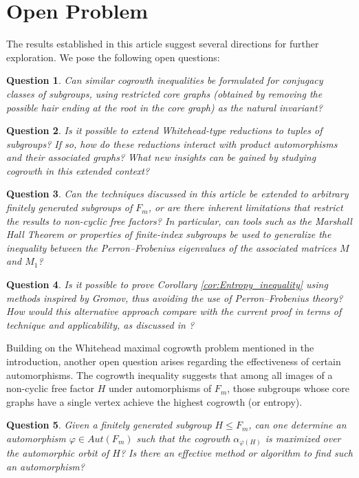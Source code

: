 \documentclass{article}
\newtheorem{myque}{Question}[section]
\begin{document}
\section{Open Problem}
The results established in this article suggest several directions for further exploration. We pose the following open questions:

\begin{myque}
Can similar cogrowth inequalities be formulated for conjugacy classes of subgroups, using restricted core graphs (obtained by removing the possible hair ending at the root in the core graph) as the natural invariant? 
\end{myque}

\begin{myque}
Is it possible to extend Whitehead-type reductions to tuples of subgroups? If so, how do these reductions interact with product automorphisms and their associated graphs? What new insights can be gained by studying cogrowth in this extended context?
\end{myque}

\begin{myque}
Can the techniques discussed in this article be extended to arbitrary finitely generated subgroups of $F_m$, or are there inherent limitations that restrict the results to non-cyclic free factors? In particular, can tools such as the Marshall Hall Theorem or properties of finite-index subgroups be used to generalize the inequality between the Perron–Frobenius eigenvalues of the associated matrices $M$ and $M_1$?
\end{myque}

\begin{myque}
Is it possible to prove Corollary \ref{cor:Entropy_inequality} using methods inspired by Gromov, thus avoiding the use of Perron–Frobenius theory? How would this alternative approach compare with the current proof in terms of technique and applicability, as discussed in \cite{CECCHERINISILBERSTEIN200393}?
\end{myque}

Building on the Whitehead maximal cogrowth problem mentioned in the introduction, another open question arises regarding the effectiveness of certain automorphisms. The cogrowth inequality suggests that among all images of a non-cyclic free factor $H$ under automorphisms of $F_m$, those subgroups whose core graphs have a single vertex achieve the highest cogrowth (or entropy).

\begin{myque} Given a finitely generated subgroup $H \leq F_m$, can one determine an automorphism $\varphi \in Aut(F_m)$ such that the cogrowth $\alpha_{\varphi(H)}$ is maximized over the automorphic orbit of $H$? Is there an effective method or algorithm to find such an automorphism? 

\end{myque}
\end{document}
